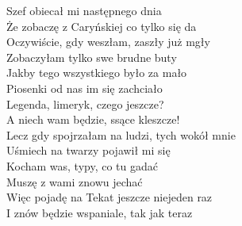\documentclass[a5paper, 10pt]{book}
\begin{document}
\begin{minipage}[t]{0.8\textwidth}
  Szef obiecał mi następnego dnia		\\
  Że zobaczę z Caryńskiej co tylko się da\\
  Oczywiście, gdy weszłam, zaszły już mgły 	\\
  Zobaczyłam tylko swe brudne buty\\

  Jakby tego wszystkiego było za mało 		\\
  Piosenki od nas im się zachciało	\\
  Legenda, limeryk, czego jeszcze?		\\
  A niech wam będzie, ssące kleszcze!\\

  Lecz gdy spojrzałam na ludzi, tych wokół mnie 	\\
  Uśmiech na twarzy pojawił mi się\\
  Kocham was, typy, co tu gadać			\\
  Muszę z wami znowu jechać	\\

  \hspace*{5mm}Więc pojadę na Tekat jeszcze niejeden raz 	\\
  \hspace*{5mm}I znów będzie wspaniale, tak jak teraz		\\
\end{minipage}
\end{document}
